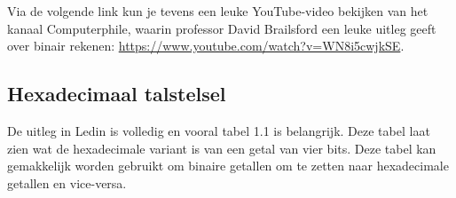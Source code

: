 

Via de volgende link kun je tevens een leuke YouTube-video bekijken van het kanaal Computerphile, waarin professor David Brailsford een leuke uitleg geeft over binair rekenen: {\color{blue} \url{https://www.youtube.com/watch?v=WN8i5cwjkSE}}.


\subsection{Hexadecimaal talstelsel}


De uitleg in Ledin is volledig en vooral tabel 1.1 is belangrijk. Deze tabel laat zien wat de hexadecimale variant is van een getal van vier bits. Deze tabel kan gemakkelijk worden gebruikt om binaire getallen om te zetten naar hexadecimale getallen en vice-versa.

